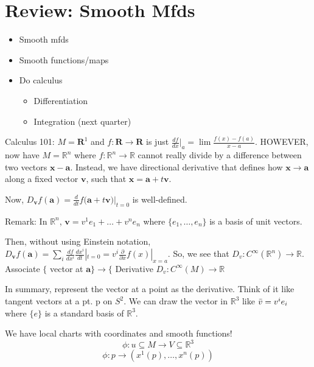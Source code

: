 \documentclass[12pt,letterpaper]{article}
\begin{document}
\section{Review: Smooth Mfds}

\begin{itemize}
    \item Smooth mfds
    \item Smooth functions/maps
    \item Do calculus 
    \begin{itemize}
        \item Differentiation
        \item Integration (next quarter)
    \end{itemize}
\end{itemize}

Calculus 101: $M = \mathbf{R}^1$ and $f: \mathbf{R} \rightarrow \mathbf{R} $ is just $\frac{df}{dx}|_a = \lim \frac{f(x)-f(a)}{x-a}$. HOWEVER, now have $M=\mathbb{R}^n$ where $f: \mathbb{R}^n \rightarrow \mathbb{R} $ cannot really divide by a difference between two vectors $\mathbf{x} - \mathbf{a}$. Instead, we have directional derivative that defines how $\mathbf{x} \rightarrow \mathbf{a}$ along a fixed vector $\mathbf{v}$, such that $\mathbf{x} = \mathbf{a} + t\mathbf{v}$. 

Now, $D_\mathbf{v} f(\mathbf{a}) = \frac{d}{dt}f(\mathbf{a} + t \mathbf{v)}|_{t=0}$ is well-defined. 

Remark: In $\mathbb{R}^n$, $\mathbf{v} = v^1 e_1 + \dots + v^n e_n$ where $\{ e_1, \dots, e_n\}$ is a basis of unit vectors. 

Then, without using Einstein notation, $D_\mathbf{v} f(\mathbf{a}) = \sum_i \frac{df}{dx^i}\frac{dx^i}{dt}|_{t=0} = v^i \frac{\partial }{\partial x}f(x)|_{x=a}$. So, we see that $D_v: C^{\infty}(\mathbb{R}^n) \rightarrow \mathbb{R}$. Associate $\{$ vector at $\mathbf{a}\} \rightarrow \{$ Derivative $D_v: C^{\infty}(M) \rightarrow \mathbb{R}$

In summary, represent the vector at a point as  the derivative. Think of it like tangent vectors at a pt. p on $S^2$. We can draw the vector in $\mathbb{R}^3$ like $\Bar{v} = v^i e_i$ where $\{ e \}$ is a standard basis of $\mathbb{R}^3$. 

We have local charts with coordinates and smooth functions! 
\begin{equation}
    \phi : u \subseteq M \rightarrow V \subseteq \mathbb{R}^3
\end{equation}
\begin{equation}
    \phi : p \rightarrow (x^1(p), \dots, x^n(p))
\end{equation}
\end{document}

